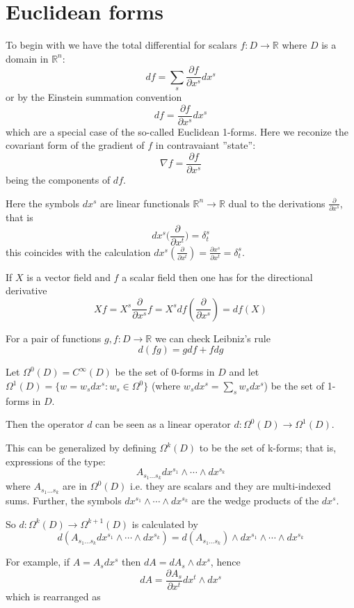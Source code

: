 \documentclass[12pt]{article}
\begin{document}
\section{\bf Euclidean forms}

To begin with we have the total differential for scalars $f\colon D\to \mathbb{R}$ where $D$ is a domain in $\mathbb{R}^n$:
$$df=\sum_s\frac{\partial f}{\partial x^s}dx^s$$
or by the Einstein summation convention
$$df=\frac{\partial f}{\partial x^s}dx^s$$
which are a special case of the so-called Euclidean 1-forms. 
Here we reconize the covariant form of the gradient of $f$ in contravaiant ''state'':
$$\nabla f=\frac{\partial f}{\partial x^s}$$ 
being the components of $df$.

Here the symbols $dx^s$ are linear functionals $\mathbb{R}^n\to \mathbb{R}$ dual to the derivations $\frac{\partial }{\partial x^s}$, that is
$$dx^s\Big(\frac{\partial}{\partial x^t}\Big)=\delta^s_t$$
this coincides with the calculation
$dx^s(\frac{\partial }{\partial x^t})=\frac{\partial x^s}{\partial x^t}=\delta^s_t$.

If $X$ is a vector field and $f$ a scalar field then one has for the directional derivative
$$Xf=X^s\frac{\partial}{\partial x^s}f=X^sdf(\frac{\partial}{\partial x^s})=df(X)$$

For a pair of functions $g,f\colon D\to \mathbb{R}$ we can check Leibniz's rule
$$d(fg)=gdf+fdg$$

Let $\Omega^0(D)=C^{\infty}(D)$ be the set of 0-forms in $D$ and let $\Omega^1(D)=\{ w=w_sdx^s\colon w_s\in\Omega^0\}$
(where $w_sdx^s=\sum_sw_sdx^s$) be the set of 1-forms in $D$.

Then the operator $d$ can be seen as a linear operator $d\colon \Omega^0(D)\to\Omega^1(D)$.

This can be generalized by defining $\Omega^k(D)$ to be the set of k-forms; that is,
expressions of the type:
$$A_{s_1...s_k}dx^{s_1}\wedge\cdots\wedge dx^{s_k}$$
where $A_{s_1...s_k}$ are in $\Omega^0(D)$ i.e. they are scalars and
they are multi-indexed sums. Further, the symbols $dx^{s_1}\wedge\cdots\wedge dx^{s_k}$ are the wedge products of the $dx^s$. 

So $d\colon \Omega^k(D)\to\Omega^{k+1}(D)$
is calculated by
$$d(A_{s_1...s_k}dx^{s_1}\wedge\cdots\wedge dx^{s_k})=
d(A_{s_1...s_k})\wedge dx^{s_1}\wedge\cdots\wedge dx^{s_k}$$

For example, if $A=A_sdx^s$ then $dA=dA_s\wedge dx^s$, hence 
$$dA=\frac{\partial A_s}{\partial x^t}dx^t\wedge dx^s$$ 
which is rearranged as
\end{document}
